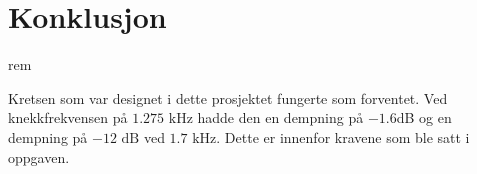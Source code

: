 
\section{Konklusjon}
\label{konklusjon}
rem

Kretsen som var designet i dette prosjektet fungerte som forventet. Ved knekkfrekvensen på $1.275\text{ kHz}$ hadde den en dempning på $-1.6$dB og en dempning på $-12\text{ dB}$ ved $1.7\text{ kHz}$. Dette er innenfor kravene som ble satt i oppgaven. 